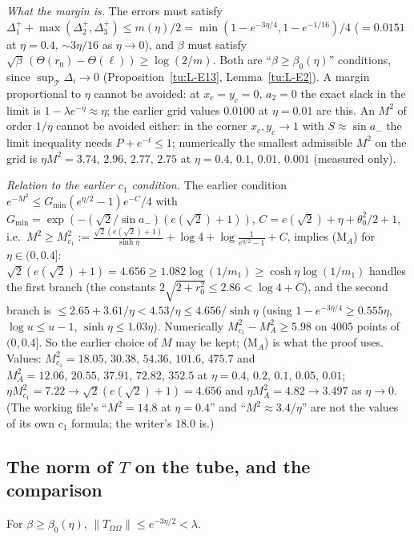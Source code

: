 \noindent\emph{What the margin is.} The errors must satisfy $\Delta_1^++\max(\Delta_2^+,\Delta_3^+)\le m(\eta)/2
=\min(1-e^{-3\eta/4},1-e^{-1/16})/4$ ($=0.0151$ at $\eta=0.4$, $\sim3\eta/16$ as $\eta\to0$), and $\beta$ must satisfy
$\sqrt\beta\,(\Theta(r_0)-\Theta(\ell))\ge\log(2/m)$. Both are ``$\beta\ge\beta_0(\eta)$'' conditions, since $\sup_{\mathcal T}\Delta_i\to0$
(Proposition~\ref{tu:L-E13}, Lemma~\ref{tu:L-E2}). A margin proportional to $\eta$ cannot be avoided: at $x_c=y_c=0$, $a_2=0$ the
exact slack in the limit is $1-\lambda e^{-\eta}\approx\eta$; the earlier grid values $0.0100$ at $\eta=0.01$ are this.
An $M^2$ of order $1/\eta$ cannot be avoided either: in the corner $x_c,y_c\to1$ with $S\approx\sin a_-$ the limit inequality
needs $P+e^{-t}\le1$; numerically the smallest admissible $M^2$ on the grid is $\eta M^2=3.74,\,2.96,\,2.77,\,2.75$ at
$\eta=0.4,\,0.1,\,0.01,\,0.001$ (measured only).

\noindent\emph{Relation to the earlier $c_1$ condition.} The earlier condition $e^{-M^2}\le G_{\min}(e^{\eta/2}-1)e^{-C}/4$ with
$G_{\min}=\exp(-(\sqrt2/\sin a_-)(e(\sqrt2)+1))$, $C=e(\sqrt2)+\eta+\theta_0^2/2+1$, i.e.\
$M^2\ge M_{c_1}^2:=\frac{\sqrt2(e(\sqrt2)+1)}{\sinh\eta}+\log4+\log\frac1{e^{\eta/2}-1}+C$, implies (M$_A$) for $\eta\in(0,0.4]$:
$\sqrt2(e(\sqrt2)+1)=4.656\ge1.082\log(1/m_1)\ge\cosh\eta\log(1/m_1)$ handles the first branch (the constants
$2\sqrt{2+r_0^2}\le2.86<\log4+C$), and the second branch is $\le2.65+3.61/\eta<4.53/\eta\le4.656/\sinh\eta$ (using
$1-e^{-3\eta/4}\ge0.555\eta$, $\log u\le u-1$, $\sinh\eta\le1.03\eta$). Numerically $M_{c_1}^2-M_A^2\ge5.98$ on $4005$ points
of $(0,0.4]$. So the earlier choice of $M$ may be kept; (M$_A$) is what the proof uses. Values:
$M_{c_1}^2=18.05,\,30.38,\,54.36,\,101.6,\,475.7$ and $M_A^2=12.06,\,20.55,\,37.91,\,72.82,\,352.5$ at
$\eta=0.4,\,0.2,\,0.1,\,0.05,\,0.01$; $\eta M_{c_1}^2=7.22\to\sqrt2(e(\sqrt2)+1)=4.656$ and $\eta M_A^2=4.82\to3.497$ as
$\eta\to0$. (The working file's ``$M^2=14.8$ at $\eta=0.4$'' and ``$M^2\approx3.4/\eta$'' are not the values of its own $c_1$
formula; the writer's $18.0$ is.)

\subsection{The norm of $T$ on the tube, and the comparison}

\begin{lemma}\label{tu:L-norm}
For $\beta\ge\beta_0(\eta)$, $\|T_{\Omega\Omega}\|\le e^{-3\eta/2}<\lambda$.
\end{lemma}

